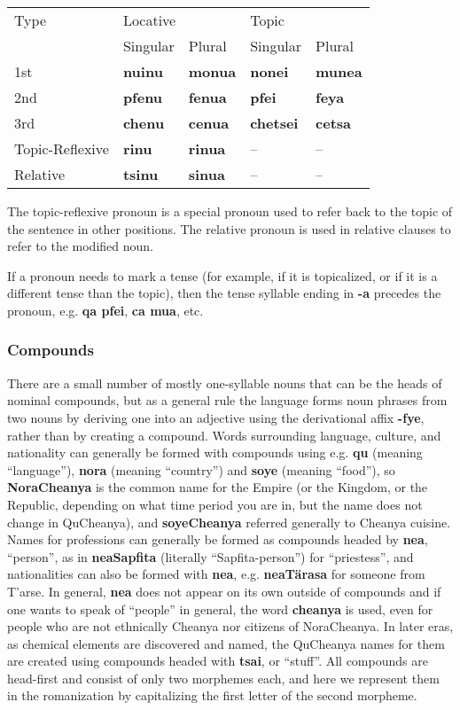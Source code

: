 \documentclass{article}
\begin{document}
\begin{table}[h]
\begin{tabular}{l | l l | l l}
Type & \multicolumn{2}{|l|}{Locative} & \multicolumn{2}{|l}{Topic} \\
& Singular & Plural & Singular & Plural \\
\hline
1st & \textbf{nuinu} & \textbf{monua} & \textbf{nonei} & \textbf{munea} \\
2nd & \textbf{pfenu} & \textbf{fenua} & \textbf{pfei} & \textbf{feya} \\
3rd & \textbf{chenu} & \textbf{cenua} & \textbf{chetsei} & \textbf{cetsa} \\
Topic-Reflexive & \textbf{rinu} & \textbf{rinua} & -- & -- \\
Relative & \textbf{tsinu} & \textbf{sinua} & -- & -- \\
\end{tabular}
\end{table}

The topic-reflexive pronoun is a special pronoun used to refer back to the topic of the sentence in other positions.  The relative pronoun is used in relative clauses to refer to the modified noun.

If a pronoun needs to mark a tense (for example, if it is topicalized, or if it is a different tense than the topic), then the tense syllable ending in \textbf{-a} precedes the pronoun, e.g. \textbf{qa pfei}, \textbf{ca mua}, etc.

\subsubsection{Compounds}

There are a small number of mostly one-syllable nouns that can be the heads of nominal compounds, but as a general rule the language forms noun phrases from two nouns by deriving one into an adjective using the derivational affix \textbf{-fye}, rather than by creating a compound.  Words surrounding language, culture, and nationality can generally be formed with compounds using e.g. \textbf{qu} (meaning ``language''), \textbf{nora} (meaning ``country'') and \textbf{soye} (meaning ``food''), so \textbf{NoraCheanya} is the common name for the Empire (or the Kingdom, or the Republic, depending on what time period you are in, but the name does not change in QuCheanya), and \textbf{soyeCheanya} referred generally to Cheanya cuisine.  Names for professions can generally be formed as compounds headed by \textbf{nea}, ``person'', as in \textbf{neaSapfita} (literally ``Sapfita-person'') for ``priestess'', and nationalities can also be formed with \textbf{nea}, e.g. \textbf{neaT\"arasa} for someone from T'arse.  In general, \textbf{nea} does not appear on its own outside of compounds and if one wants to speak of ``people'' in general, the word \textbf{cheanya} is used, even for people who are not ethnically Cheanya nor citizens of NoraCheanya.  In later eras, as chemical elements are discovered and named, the QuCheanya names for them are created using compounds headed with \textbf{tsai}, or ``stuff''.  All compounds are head-first and consist of only two morphemes each, and here we represent them in the romanization by capitalizing the first letter of the second morpheme.
\end{document}
